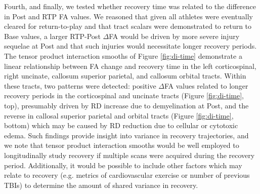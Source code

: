 \documentclass[12pt]{article}
\begin{document}
Fourth, and finally, we tested whether recovery time was related to the difference in Post and RTP FA values. We reasoned that given all athletes were eventually cleared for return-to-play and that tract scalars were demonstrated to return to Base values, a larger RTP-Post $\Delta$FA would be driven by more severe injury sequelae at Post and that such injuries would necessitate longer recovery periods. The tensor product interaction smooths of Figure \ref{fig:di-time} demonstrate a linear relationship between FA change and recovery time in the left corticospinal, right uncinate, callosum superior parietal, and callosum orbital tracts. Within these tracts, two patterns were detected: positive $\Delta$FA values related to longer recovery periods in the corticospinal and uncinate tracts (Figure \ref{fig:di-time}, top), presumably driven by RD increase due to demyelination at Post, and the reverse in callosal superior parietal and orbital tracts (Figure \ref{fig:di-time}, bottom) which may be caused by RD reduction due to cellular or cytotoxic edema. Such findings provide insight into variance in recovery trajectories, and we note that tensor product interaction smooths would be well employed to longitudinally study recovery if multiple scans were acquired during the recovery period. Additionally, it would be possible to include other factors which may relate to recovery (e.g. metrics of cardiovascular exercise or number of previous TBIs) to determine the amount of shared variance in recovery.
\end{document}
